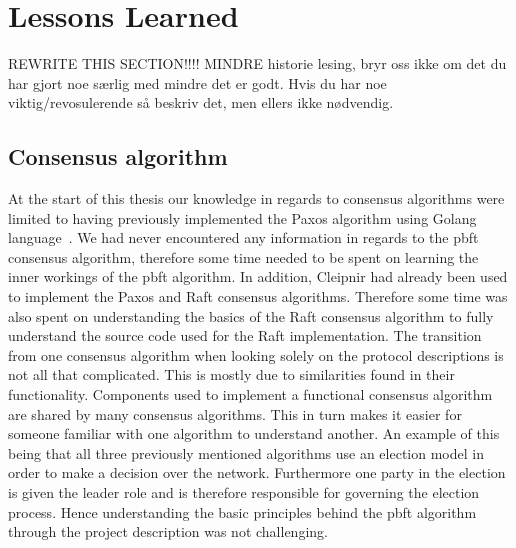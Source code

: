 \section{Lessons Learned}
\iffalse
-PBFT
-Asynchronous programming with C#, Task architecture
-Reactive Programming basics
-Overall knowledge for Cleipnir
-Issues and advantages in regards to the topics listed over. For instance a lot of time was wasted due to not fully grasping how Cleipnir work internally when performing the reactive part and the CAwaitable emission --> resulting a month of frustration trying to figure out why collision errors occur.
-Lack of documentation can be quite fatal for continued support.
-The multitude of potential issues that could occur that aren't necessary dealt with in the theoretical consensus algorithm or pseudo code.
-Cleipnir and how it interacts with the other programming paradigms. Eks: A clear distinction has to made in regards to what code is run inside Cleipnir(the persistent part) and what is not called in Cleipnir (orthogonal part), mixing these will cause disastrous results, which we infact encountered several times during implementation.
\fi
REWRITE THIS SECTION!!!! MINDRE historie lesing, bryr oss ikke om det du har gjort noe særlig med mindre det er godt. Hvis du har noe viktig/revosulerende så beskriv det, men ellers ikke nødvendig.
\subsection{Consensus algorithm}
At the start of this thesis our knowledge in regards to consensus algorithms were limited to having previously implemented the Paxos algorithm using Golang language~\cite{WEB:golangmainpage}. We had never encountered any information in regards to the \ac{pbft} consensus algorithm, therefore some time needed to be spent on learning the inner workings of the \ac{pbft} algorithm. In addition, Cleipnir had already been used to implement the Paxos and Raft consensus algorithms. Therefore some time was also spent on understanding the basics of the Raft consensus algorithm to fully understand the source code used for the Raft implementation. The transition from one consensus algorithm when looking solely on the protocol descriptions is not all that complicated. This is mostly due to similarities found in their functionality. Components used to implement a functional consensus algorithm are shared by many consensus algorithms. This in turn makes it easier for someone familiar with one algorithm to understand another. An example of this being that all three previously mentioned algorithms use an election model in order to make a decision over the network. Furthermore one party in the election is given the leader role and is therefore responsible for governing the election process. Hence understanding the basic principles behind the \ac{pbft} algorithm through the project description was not challenging.

